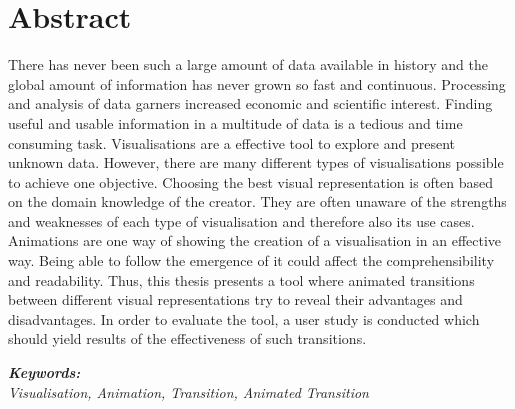 \section*{Abstract}
\vspace{0.5cm}

There has never been such a large amount of data available in history and the global amount of information has never grown so fast and continuous. Processing and analysis of data garners increased economic and scientific interest. Finding useful and usable information in a multitude of data is a tedious and time consuming task. Visualisations are a effective tool to explore and present unknown data. However, there are many different types of visualisations possible to achieve one objective. Choosing the best visual representation is often based on the domain knowledge of the creator. They are often unaware of the strengths and weaknesses of each type of visualisation and therefore also its use cases.
\cbstart
Animations are one way of showing the creation of a visualisation in an effective way. Being able to follow the emergence of it could affect the comprehensibility and readability. Thus, this thesis presents a tool where animated transitions between different visual representations try to reveal their advantages and disadvantages. In order to evaluate the tool, a user study is conducted which should yield results of the effectiveness of such transitions.
\cbend


\vspace{0.5cm}
\textbf{\textit{Keywords:}} \\
\textit{Visualisation, Animation, Transition, Animated Transition}